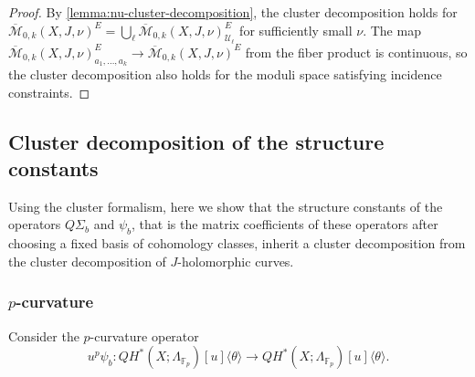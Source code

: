 \documentclass[reqno]{amsart}
\numberwithin{equation}{section}
\numberwithin{equation}{section}
\numberwithin{equation}{section}
\newtheorem{lemma}[thm]{Lemma}
\theoremstyle{definition}
\theoremstyle{remark}
\theoremstyle{remark}
\newcommand{\ov}{\overline}
\begin{document}
\begin{proof}
    By \cref{lemma:nu-cluster-decomposition}, the cluster decomposition holds for $\ov{\mathcal{M}}_{0,k}(X,J, \nu)^E  = \bigcup_{\ell} \ov{\mathcal{M}}_{0,k}(X,J, \nu)^E _{\mathcal{U}_\ell}$ for sufficiently small $\nu$. The map $\ov{\mathcal{M}}_{0,k}(X,J, \nu)^E_{a_1, \dots, a_k} \to \ov{\mathcal{M}}_{0,k}(X,J, \nu)^E $ from the fiber product is continuous, so the cluster decomposition also holds for the moduli space satisfying incidence constraints.
\end{proof}

\subsection{Cluster decomposition of the structure constants}
Using the cluster formalism, here we show that the structure constants of the operators $Q\Sigma_b$ and $\psi_b$, that is the matrix coefficients of these operators after choosing a fixed basis of cohomology classes, inherit a cluster decomposition from the cluster decomposition of $J$-holomorphic curves.

\subsubsection{$p$-curvature}

Consider the $p$-curvature operator
\begin{equation}
    u^p \psi_b : QH^*(X;\Lambda_{\mathbb{F}_p})[u]\langle \theta \rangle \to QH^*(X;\Lambda_{\mathbb{F}_p})[u]\langle \theta \rangle.
\end{equation}
\end{document}

